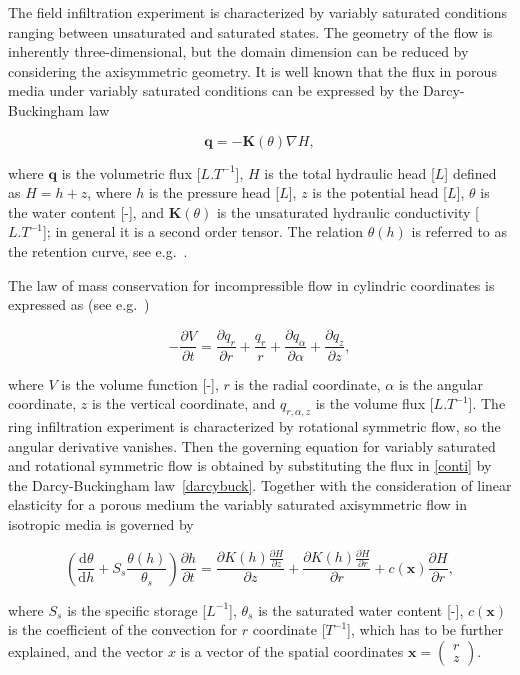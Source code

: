 \documentclass[review]{myarticle}
\newenvironment{lineq}
    {\begin{linenomath*}
    \begin{equation}
    }
    { 
    \end{equation} 
    \end{linenomath*}
    }
\newcommand{\dd}{\mathrm{d}}
\renewcommand{\vec}{\mathbf}
\begin{document}
The field infiltration experiment is characterized by variably saturated conditions ranging between unsaturated and saturated states. The geometry of the flow is inherently three-dimensional, but the domain dimension can be reduced by considering the axisymmetric geometry. It is well known that the flux in porous media under variably saturated conditions can be expressed by the Darcy-Buckingham law~\citep{buckingham} \begin{lineq}\label{darcybuck}\vec{q} = -\mathbf{K}(\theta) \nabla H,\end{lineq} where $\vec{q}$ is the volumetric flux [$L.T^{-1}$], $H$ is the total hydraulic head [$L$] defined as $H=h+z$, where $h$ is the pressure head [$L$], $z$ is the potential head [$L$], $\theta$ is the water content [-], and $\mathbf{K}(\theta)$ is the unsaturated hydraulic conductivity  [$L.T^{-1}$]; in general it is a  second order tensor. The relation $\theta(h)$ is referred to as the retention curve, see e.g.~\citep{vangenuchten}.

The law of mass conservation  for incompressible flow in cylindric coordinates  is expressed as (see e.g.~\citep{bear1979})
\begin{lineq}
\label{conti}
-\frac{\partial V}{\partial t} = \frac{\partial q_r}{\partial r} + \frac{q_r}{r} + \frac{\partial q_{\alpha}}{\partial \alpha} + \frac{\partial q_z}{\partial z} ,
\end{lineq}
where $V$ is the volume function [-],  $r$ is the radial coordinate, $\alpha$ is the angular coordinate,  $z$ is the vertical coordinate, and $q_{r, \alpha, z}$ is the  volume flux [$L.T^{-1}$]. The ring infiltration experiment is characterized by rotational symmetric flow, so the angular derivative vanishes. Then the governing equation for  variably saturated and rotational symmetric flow is obtained by substituting the flux in \eqref{conti} by the Darcy-Buckingham law~\eqref{darcybuck}. Together with the consideration of linear elasticity for a porous medium the variably saturated axisymmetric flow in isotropic media is governed by
\begin{lineq}
\label{richaxi}
\left(\frac{\dd \theta}{\dd h} + S_s\frac{\theta(h)}{\theta_s} \right) \frac{\partial h}{\partial t}  =  \frac{\partial K(h) \frac{\partial H}{\partial z}}{\partial z} + \frac{\partial K(h) \frac{\partial H}{\partial r}}{\partial r} + c(\vec{x})\frac{\partial H}{\partial r},
\end{lineq}
where $S_s$ is the specific storage [$L^{-1}$], $\theta_s$ is the saturated water content [-],  $c(\vec{x})$ is the coefficient of the convection for $r$ coordinate [$T^{-1}$], which has to be further explained, and the vector $x$ is a vector of the spatial coordinates $\vec{x}=\left( \begin{smallmatrix} r \\ z \end{smallmatrix} \right)$.
\end{document}
